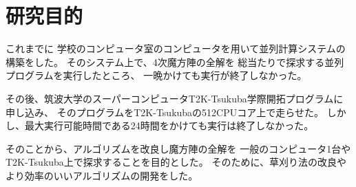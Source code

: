 \section{研究目的}
これまでに
学校のコンピュータ室のコンピュータを用いて並列計算システムの構築をした。
そのシステム上で、4次魔方陣の全解を
総当たりで探求する並列プログラムを実行したところ、
一晩かけても実行が終了しなかった。

その後、筑波大学のスーパーコンピュータT2K-Tsukuba学際開拓プログラムに申し込み、
そのプログラムをT2K-Tsukubaの512CPUコア上で走らせた。
しかし、最大実行可能時間である24時間をかけても実行は終了しなかった。

そのことから、アルゴリズムを改良し魔方陣の全解を
一般のコンピュータ1台やT2K-Tsukuba上で探求することを目的とした。
そのために、草刈り法の改良やより効率のいいアルゴリズムの開発をした。
